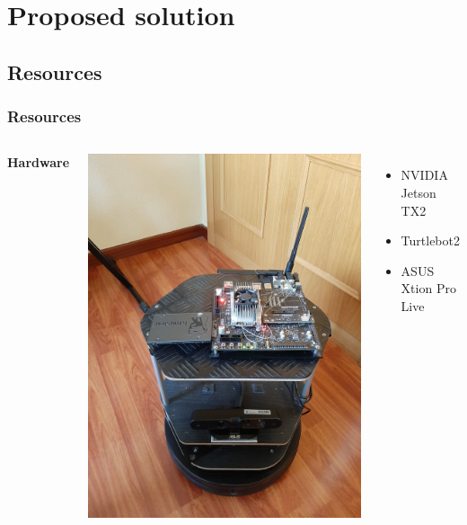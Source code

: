 \documentclass[11pt]{beamer}
\begin{document}
\begin{frame}
\begin{columns}
\begin{center}
			\end{center}
		
	\end{columns}
\end{frame}


\section{Proposed solution}
\subsection{Resources}
\begin{frame}
	\frametitle{Resources}
	\begin{columns}
		\textbf{Hardware}\\
		\vspace{0.55cm}
		\begin{center}
			\includegraphics[width=0.6\linewidth]{setup_front} \\
		\end{center}
		\begin{itemize}
			\item NVIDIA Jetson TX2
			\item Turtlebot2
			\item ASUS Xtion Pro Live
		\end{itemize}
		

\end{columns}
\end{frame}
\end{document}
